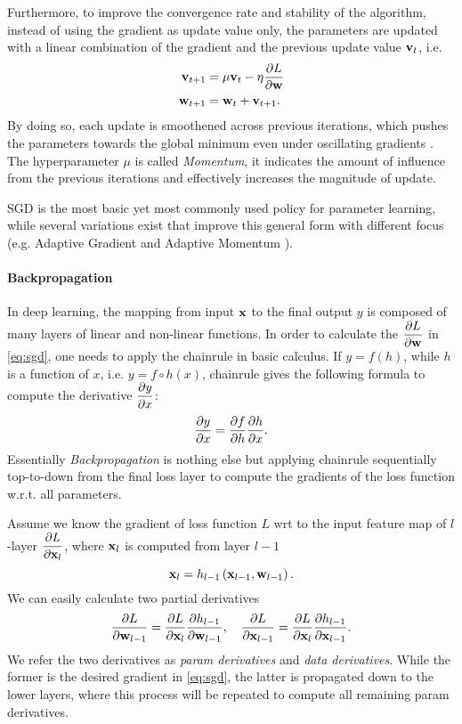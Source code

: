 Furthermore, to improve the convergence rate and stability of the algorithm, instead of using the gradient as update value only, the parameters are updated with a linear combination of the gradient and the previous update value $ \mathbf{v}_{t} $, i.e. 
\begin{align}\label{eq:sgd}
\mathbf{v}_{t+1} & = \mu \mathbf{v}_{t} - \eta \dfrac{\partial L}{\partial \mathbf{w}}\\
\mathbf{w}_{t+1} & = \mathbf{w}_{t} +  \mathbf{v}_{t+1}.
\end{align}
By doing so, each update is smoothened across previous iterations, which pushes the parameters towards the global minimum even under oscillating gradients \cite{polyak1964some}. The hyperparameter $ \mu $ is called \textit{Momentum}, it indicates the amount of influence from the previous iterations and effectively increases the magnitude of update.

SGD is the most basic yet most commonly used policy for parameter learning, while several variations exist that improve this general form with different focus (e.g. Adaptive Gradient \cite{duchi2011adaptive} and Adaptive Momentum \cite{kingma2014adam}).

\paragraph{Backpropagation}
In deep learning, the mapping from input $ \mathbf{x} $ to the final output $ y $ is composed of many layers of linear and non-linear functions. 
In order to calculate the $ \dfrac{\partial L}{\partial \mathbf{w}} $ in \autoref{eq:sgd}, one needs to apply the chainrule in basic calculus.
If $ y=f\left(h\right) $, while $ h $ is a function of $ x $, i.e. $ y = f\circ h\left(x\right) $, chainrule gives the following formula to compute the derivative $ \dfrac{\partial y}{\partial x} $:
\[ \dfrac{\partial y}{\partial x} =  \dfrac{\partial f}{\partial h}\dfrac{\partial h}{\partial x}.\]
Essentially \textit{Backpropagation} is nothing else but applying chainrule sequentially top-to-down from the final loss layer to compute the gradients of the loss function w.r.t. all parameters.

Assume we know the gradient of loss function $ L $ wrt to the input feature map of $ l $-layer $ \dfrac{\partial L}{\partial \mathbf{x}_l} $,
where $ \mathbf{x}_l $ is computed from layer $ l-1 $ 
\[ \mathbf{x}_l = h_{l-1}\left(\mathbf{x}_{l-1}, \mathbf{w}_{l-1}\right). \]
We can easily calculate two partial derivatives
\begin{equation}\label{eq:backprop}
\dfrac{\partial L}{\partial \mathbf{w}_{l-1}} = \dfrac{\partial L}{\partial \mathbf{x}_l}\dfrac{\partial h_{l-1}}{\partial \mathbf{w}_{l-1}} ,\quad
\dfrac{\partial L}{\partial \mathbf{x}_{l-1}} = \dfrac{\partial L}{\partial \mathbf{x}_l}\dfrac{\partial h_{l-1}}{\partial \mathbf{x}_{l-1}}.
\end{equation}
 We refer the two derivatives as \textit{param derivatives} and \textit{data derivatives}. While the former is the desired gradient in \autoref{eq:sgd}, the latter is propagated down to the lower layers, where this process will be repeated to compute all remaining param derivatives.

